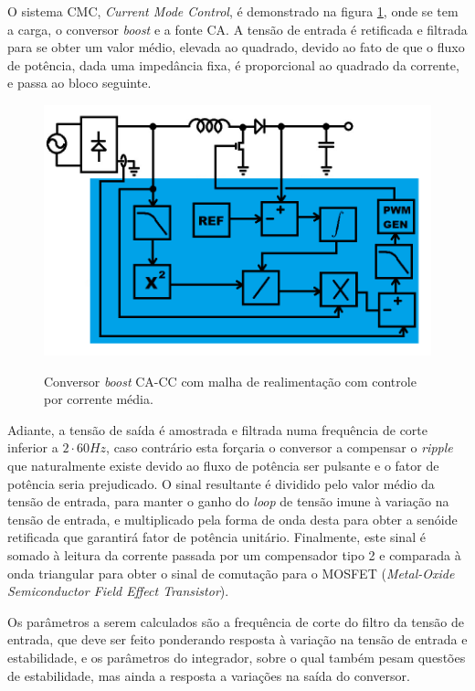 \documentclass[
        12pt,
        openany, %
        oneside, %
        a4paper,			
        english,			
        brazil
        ]{abntbibufjf}
\begin{document}
O sistema CMC, \textit{Current Mode Control}, é demonstrado na figura \ref{cmc}, onde se tem a carga, o conversor \textit{boost} e a fonte CA. A tensão de entrada é retificada e filtrada para se obter um valor médio, elevada ao quadrado, devido ao fato de que o fluxo de potência, dada uma impedância fixa, é proporcional ao quadrado da corrente, e passa ao bloco seguinte.

\begin{figure}[!h]
	\centering
	\caption{Conversor \textit{boost} CA-CC com malha de realimentação com controle por corrente média.}
	\includegraphics[scale=.4]{../ESQUEMAS/PFC_CTRL.png}\\
	\label{cmc}
\end{figure}


Adiante, a tensão de saída é amostrada e filtrada numa frequência de corte inferior a $2 \cdot 60Hz$, caso contrário esta forçaria o conversor a compensar o \textit{ripple} que naturalmente existe devido ao fluxo de potência ser pulsante e o fator de potência seria prejudicado. O sinal resultante é dividido pelo valor médio da tensão de entrada, para manter o ganho do \textit{loop} de tensão imune à variação na tensão de entrada, e multiplicado pela forma de onda desta para obter a senóide retificada que garantirá fator de potência unitário. Finalmente, este sinal é somado à leitura da corrente passada por um compensador tipo 2 e comparada à onda triangular para obter o sinal de comutação para o MOSFET (\textit{Metal-Oxide Semiconductor Field Effect Transistor}).

Os parâmetros a serem calculados são a frequência de corte do filtro da tensão de entrada, que deve ser feito ponderando resposta à variação na tensão de entrada e estabilidade, e os parâmetros do integrador, sobre o qual também pesam questões de estabilidade, mas ainda a resposta a variações na saída do conversor.
\end{document}
